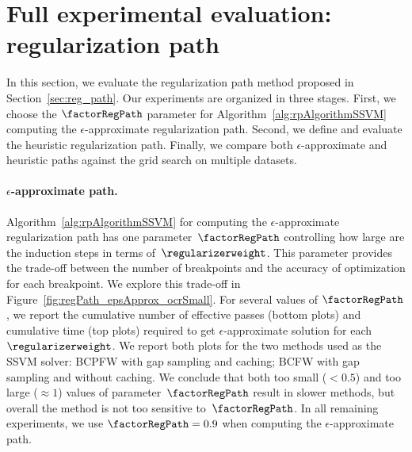 \documentclass{article}
\begin{document}
\section{Full experimental evaluation: regularization path}
\label{app:exp2}
In this section, we evaluate the regularization path method proposed in Section~\ref{sec:reg_path}.
Our experiments are organized in three stages.
First, we choose the $\factorRegPath$ parameter for Algorithm~\ref{alg:rpAlgorithmSSVM} computing the $\epsilon$-approximate regularization path.
Second, we define and evaluate the heuristic regularization path.
Finally, we compare both $\epsilon$-approximate and heuristic paths against the grid search on multiple datasets.

%
%
%

%
%
%
%


%
%
%
%
%
%

\paragraph{$\epsilon$-approximate path.}
Algorithm~\ref{alg:rpAlgorithmSSVM} for computing the $\epsilon$-approximate regularization path has one parameter~$\factorRegPath$ controlling how large are the induction steps in terms of~$\regularizerweight$.
This parameter provides the trade-off between the number of breakpoints and the accuracy of optimization for each breakpoint.
We explore this trade-off in Figure~\ref{fig:regPath_epsApprox_ocrSmall}.
For several values of $\factorRegPath$, we report the cumulative number of effective passes (bottom plots) and cumulative time (top plots) required to get  $\epsilon$-approximate solution for each $\regularizerweight$. 
We report both plots for the two methods used as the SSVM solver: BCPFW with gap sampling and caching; BCFW with gap sampling and without caching.
We conclude that both too small ($< 0.5$) and too large ($\approx 1$) values of parameter~$\factorRegPath$ result in slower methods, but overall the method is not too sensitive to~$\factorRegPath$. In all remaining experiments, we use $\factorRegPath=0.9$ when computing the $\epsilon$-approximate path.

%
%
%
%
%
%
%
\end{document}
